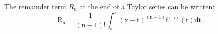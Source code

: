 The remainder term $R_{n}$  at the end of a Taylor series can be written:
\[ \mathrm{R}_{\mathrm{n}} = 
\frac{1}{( \mathrm{n} - 1 ) ! } 
\int _{\mathrm{a}} ^{\mathrm{x}}
( \mathrm{x-t} ) ^{ ( \mathrm{n} -1 ) }
\mathrm{f} ^{( \mathrm{n} ) } ( \mathrm{t} ) \mathrm{dt} . \]